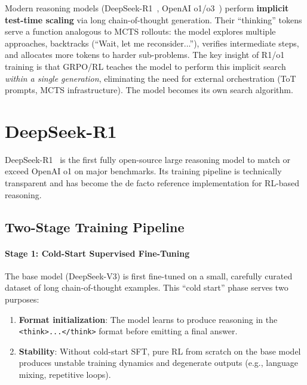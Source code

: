 \begin{intuitionbox}
Modern reasoning models (DeepSeek-R1~\cite{deepseek2025r1}, OpenAI o1/o3~\cite{openai2024o1, openai2025o3}) perform \textbf{implicit test-time scaling} via long chain-of-thought generation. Their ``thinking'' tokens serve a function analogous to MCTS rollouts: the model explores multiple approaches, backtracks (``Wait, let me reconsider...''), verifies intermediate steps, and allocates more tokens to harder sub-problems. The key insight of R1/o1 training is that GRPO/RL teaches the model to perform this implicit search \emph{within a single generation}, eliminating the need for external orchestration (ToT prompts, MCTS infrastructure). The model becomes its own search algorithm.
\end{intuitionbox}

\section{DeepSeek-R1}
\label{subsec:deepseek_r1}

DeepSeek-R1~\cite{deepseek2025r1} is the first fully open-source large reasoning model to match or exceed OpenAI o1 on major benchmarks. Its training pipeline is technically transparent and has become the de facto reference implementation for RL-based reasoning.

\subsection{Two-Stage Training Pipeline}
\label{two-stage-training-pipeline}

\paragraph{Stage 1: Cold-Start Supervised Fine-Tuning}
\label{stage-1-cold-start-supervised-fine-tuning}

The base model (DeepSeek-V3) is first fine-tuned on a small, carefully curated dataset of long chain-of-thought examples. This ``cold start'' phase serves two purposes:

\begin{enumerate}
  \item \textbf{Format initialization}: The model learns to produce reasoning in the \texttt{<think>...</think>} format before emitting a final answer.
  \item \textbf{Stability}: Without cold-start SFT, pure RL from scratch on the base model produces unstable training dynamics and degenerate outputs (e.g., language mixing, repetitive loops).
\end{enumerate}

